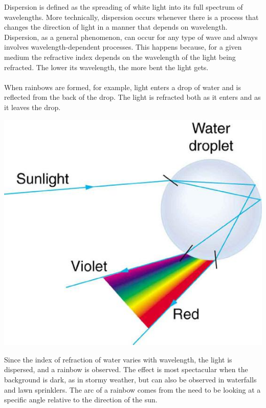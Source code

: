 \documentclass[11pt]{article}
\begin{document}
	Dispersion is defined as the spreading of white light into its full spectrum of wavelengths. More technically, dispersion occurs whenever there is a process that changes the direction of light in a manner that depends on wavelength. Dispersion, as a general phenomenon, can occur for any type of wave and always involves wavelength-dependent processes. This happens because, for a given medium the refractive index depends on the wavelength of the light being refracted. The lower its wavelength, the more bent the light gets. \\ \\
	When rainbows are formed, for example, light enters a drop of water and is reflected from the back of the drop. The light is refracted both as it enters and as it leaves the drop. 
	\begin{center}
		\includegraphics[scale=0.3]{droplet}
	\end{center}
	Since the index of refraction of water varies with wavelength, the light is dispersed, and a rainbow is observed. The effect is most spectacular when the background is dark, as in stormy weather, but can also be observed in waterfalls and lawn sprinklers. The arc of a rainbow comes from the need to be looking at a specific angle relative to the direction of the sun.
\end{document}
